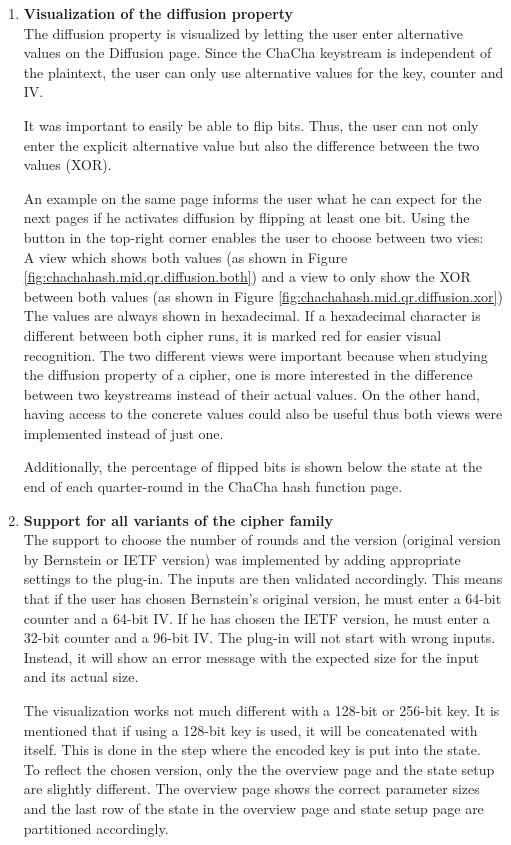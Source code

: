\begin{enumerate}[label=(\labelenum{G}{{\arabic*}}), wide, labelwidth=!, labelindent=0pt]
     \item \textbf{Visualization of the diffusion property}\\
     The diffusion property is visualized by letting the user enter alternative values on the Diffusion page. Since the ChaCha keystream is independent of the plaintext, the user can only use alternative values for the key, counter and IV.
     
     It was important to easily be able to flip bits. Thus, the user can not only enter the explicit alternative value but also the difference between the two values (XOR).
     
     An example on the same page informs the user what he can expect for the next pages if he activates diffusion by flipping at least one bit. Using the button in the top-right corner enables the user to choose between two vies: \\
     A view which shows both values (as shown in Figure \ref{fig:chachahash.mid.qr.diffusion.both}) and a view to only show the XOR between both values (as shown in Figure \ref{fig:chachahash.mid.qr.diffusion.xor})\\
     The values are always shown in hexadecimal. If a hexadecimal character is different between both cipher runs, it is marked red for easier visual recognition. The two different views were important because when studying the diffusion property of a cipher, one is more interested in the difference between two keystreams instead of their actual values. On the other hand, having access to the concrete values could also be useful thus both views were implemented instead of just one.
     
     Additionally, the percentage of flipped bits is shown below the state at the end of each quarter-round in the ChaCha hash function page.
     
     \item \textbf{Support for all variants of the cipher family}\\
     The support to choose the number of rounds and the version (original version by Bernstein or IETF version) was implemented by adding appropriate settings to the plug-in. The inputs are then validated accordingly. This means that if the user has chosen Bernstein's original version, he must enter a 64-bit counter and a 64-bit IV. If he has chosen the IETF version, he must enter a 32-bit counter and a 96-bit IV. The plug-in will not start with wrong inputs. Instead, it will show an error message with the expected size for the input and its actual size.
     
     The visualization works not much different with a 128-bit or 256-bit key. It is mentioned that if using a 128-bit key is used, it will be concatenated with itself. This is done in the step where the encoded key is put into the state.\\
     To reflect the chosen version, only the the overview page and the state setup are slightly different. The overview page shows the correct parameter sizes and the last row of the state in the overview page and state setup page are partitioned accordingly.
  \end{enumerate}

